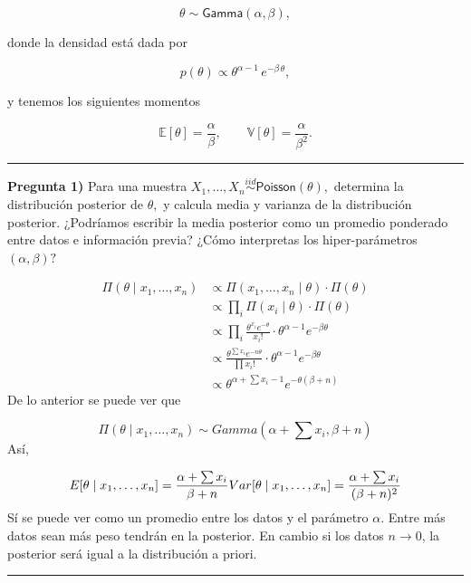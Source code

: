 \documentclass[
]{article}
\begin{document}
\[\theta \sim \textsf{Gamma}(\alpha, \beta),\]

donde la densidad está dada por

\[ p(\theta) \propto \theta^{\alpha - 1} \, e^{-\beta \, \theta},\]

y tenemos los siguientes momentos

\[\mathbb{E}[\theta] = \frac\alpha\beta, \qquad  \mathbb{V}[\theta] = \frac{\alpha}{\beta^2}.\]

\begin{center}\rule{0.5\linewidth}{0.5pt}\end{center}

\textbf{Pregunta 1)} Para una muestra
\(X_1, \ldots, X_n \overset{iid}{\sim} \textsf{Poisson}(\theta),\)
determina la distribución posterior de \(\theta,\) y calcula media y
varianza de la distribución posterior. ¿Podríamos escribir la media
posterior como un promedio ponderado entre datos e información previa?
¿Cómo interpretas los hiper-parámetros \((\alpha, \beta)?\)

\[
\begin{align}
\Pi (\theta \mid x_1 , \dots, x_n) 
&\propto \Pi (x_1, \dots, x_n \mid \theta) \cdot \Pi (\theta) \\
&\propto \prod_i{\Pi(x_i \mid \theta)} \cdot \Pi(\theta) \\
&\propto \prod_i{\frac{\theta^{x_i} e^{-\theta}}{x_i!}} \cdot \theta^{\alpha-1}e^{-\beta \theta} \\
&\propto \frac{\theta^{\sum{x_i}}e^{-n\theta}}{\prod{x_i!}} \cdot \theta^{\alpha-1}e^{-\beta \theta} \\
&\propto \theta^{\alpha + \sum{x_i} - 1}e^{-\theta(\beta + n)}
\end{align}
\] De lo anterior se puede ver que

\[
\Pi (\theta \mid x_1 , \dots, x_n)\sim Gamma(\alpha + \sum{x_i}, \beta + n)
\] Así,

\[
E[\theta \mid x_1 , \dots, x_n] = \frac{\alpha + \sum{x_i}}{\beta + n} \\
Var[\theta \mid x_1 , \dots, x_n] = \frac{\alpha + \sum{x_i}}{(\beta + n)^2} 
\] Sí se puede ver como un promedio entre los datos y el parámetro
\(\alpha\). Entre más datos sean más peso tendrán en la posterior. En
cambio si los datos \(n \to 0\), la posterior será igual a la
distribución a priori.

\begin{center}\rule{0.5\linewidth}{0.5pt}\end{center}
\end{document}
